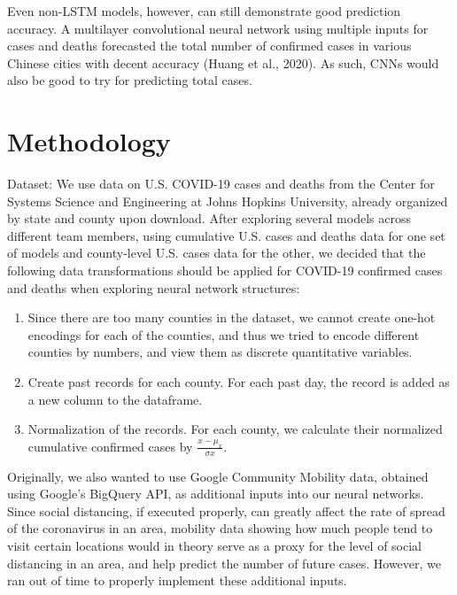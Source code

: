 ﻿\documentclass{article}
\begin{document}
\begin{multicols}{2}
Even non-LSTM models, however, can still demonstrate good prediction accuracy. A
multilayer convolutional neural network using multiple inputs for cases and
deaths forecasted the total number of confirmed cases in various Chinese cities
with decent accuracy (Huang et al., 2020). As such, CNNs would also be good to
try for predicting total cases.\\


\section*{Methodology}

Dataset: We use data on U.S. COVID-19 cases and deaths from the Center for
Systems Science and Engineering at Johns Hopkins University, already organized
by state and county upon download. After exploring several models across
different team members, using cumulative U.S. cases and deaths data for one
set of models and county-level U.S. cases data for the other, we decided that
the following data transformations should be applied for COVID-19 confirmed
cases and deaths when exploring neural network structures:

\begin{enumerate}
    \item Since there are too many counties in the dataset, we cannot create
    one-hot encodings for each of the counties, and thus we tried to encode
    different counties by numbers, and view them as discrete quantitative
    variables.

    \item Create past records for each county. For each past day, the record is
    added as a new column to the dataframe. 

    \item Normalization of the records. For each county, we calculate their
    normalized cumulative confirmed cases by $\frac{x-\mu_{x}}{\sigma{x}}$.
\end{enumerate}




Originally, we also wanted to use Google Community Mobility data, obtained using
Google’s BigQuery API, as additional inputs into our neural networks. Since
social distancing, if executed properly, can greatly affect the rate of spread
of the coronavirus in an area, mobility data showing how much people tend to
visit certain locations would in theory serve as a proxy for the level of social
distancing in an area, and help predict the number of future cases. However, we
ran out of time to properly implement these additional inputs.



\end{multicols}
\end{document}
